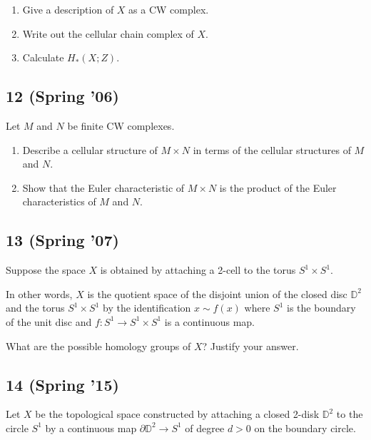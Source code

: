 \begin{enumerate}
\def\labelenumi{\alph{enumi}.}
\item
  Give a description of \(X\) as a CW complex.
\item
  Write out the cellular chain complex of \(X\).
\item
  Calculate \(H_* (X; Z)\).
\end{enumerate}

\hypertarget{spring-06-5}{%
\subsection{12 (Spring '06)}\label{spring-06-5}}

Let \(M\) and \(N\) be finite CW complexes.

\begin{enumerate}
\def\labelenumi{\alph{enumi}.}
\item
  Describe a cellular structure of \(M \times N\) in terms of the
  cellular structures of \(M\) and \(N\).
\item
  Show that the Euler characteristic of \(M \times N\) is the product of
  the Euler characteristics of \(M\) and \(N\).
\end{enumerate}

\hypertarget{spring-07-1}{%
\subsection{13 (Spring '07)}\label{spring-07-1}}

Suppose the space \(X\) is obtained by attaching a 2-cell to the torus
\(S^1 \times S^1\).

In other words, \(X\) is the quotient space of the disjoint union of the
closed disc \({\mathbb{D}}^2\) and the torus \(S^1 \times S^1\) by the
identification \(x \sim f(x)\) where \(S^1\) is the boundary of the unit
disc and \(f : S^1 \to S^1 \times S^1\) is a continuous map.

What are the possible homology groups of \(X\)? Justify your answer.

\hypertarget{spring-15-6}{%
\subsection{14 (Spring '15)}\label{spring-15-6}}

Let \(X\) be the topological space constructed by attaching a closed
2-disk \({\mathbb{D}}^2\) to the circle \(S^1\) by a continuous map
\(\partial{\mathbb{D}}^2 \to S^1\) of degree \(d > 0\) on the boundary
circle.

